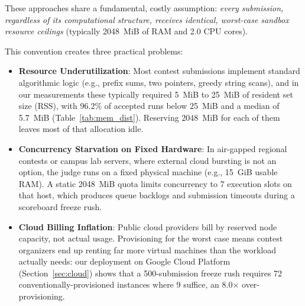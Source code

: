 \documentclass[conference]{IEEEtran}
\begin{document}
These approaches share a fundamental, costly assumption: \textit{every submission, regardless of its computational structure, receives identical, worst-case sandbox resource ceilings} (typically 2048~MiB of RAM and 2.0 CPU cores).

This convention creates three practical problems:
\begin{itemize}
    \item \textbf{Resource Underutilization}: Most contest submissions implement standard algorithmic logic (e.g., prefix sums, two pointers, greedy string scans), and in our measurements these typically required 5~MiB to 25~MiB of resident set size (RSS), with 96.2\% of accepted runs below 25~MiB and a median of 5.7~MiB (Table~\ref{tab:mem_dist}). Reserving 2048~MiB for each of them leaves most of that allocation idle.
    \item \textbf{Concurrency Starvation on Fixed Hardware}: In air-gapped regional contests or campus lab servers, where external cloud bursting is not an option, the judge runs on a fixed physical machine (e.g., 15~GiB usable RAM). A static 2048~MiB quota limits concurrency to 7 execution slots on that host, which produces queue backlogs and submission timeouts during a scoreboard freeze rush.
    \item \textbf{Cloud Billing Inflation}: Public cloud providers bill by reserved node capacity, not actual usage. Provisioning for the worst case means contest organizers end up renting far more virtual machines than the workload actually needs: our deployment on Google Cloud Platform (Section~\ref{sec:cloud}) shows that a 500-submission freeze rush requires 72 conventionally-provisioned instances where 9 suffice, an 8.0$\times$ over-provisioning.
\end{itemize}
\end{document}
